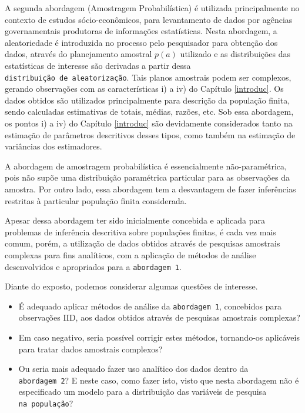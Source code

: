 \documentclass[]{book}
\numberwithin{example}{chapter}
\numberwithin{remark}{chapter}
\numberwithin{definition}{chapter}
\begin{document}
A segunda abordagem (Amostragem Probabilística) é utilizada
principalmente no contexto de estudos sócio-econômicos, para
levantamento de dados por agências governamentais produtoras de
informações estatísticas. Nesta abordagem, a aleatoriedade é introduzida
no processo pelo pesquisador para obtenção dos dados, através do
planejamento amostral \(p(a)\) utilizado \citep{Neyman} e as
distribuições das estatísticas de interesse são derivadas a partir dessa
\texttt{distribuição\ de\ aleatorização}. Tais planos amostrais podem
ser complexos, gerando observações com as características i) a iv) do
Capítulo \ref{introduc}. Os dados obtidos são utilizados principalmente
para descrição da população finita, sendo calculadas estimativas de
totais, médias, razões, etc. Sob essa abordagem, os pontos i) a iv) do
Capítulo \ref{introduc} são devidamente considerados tanto na estimação
de parâmetros descritivos desses tipos, como também na estimação de
variâncias dos estimadores.

A abordagem de amostragem probabilística é essencialmente
não-paramétrica, pois não supõe uma distribuição paramétrica particular
para as observações da amostra. Por outro lado, essa abordagem tem a
desvantagem de fazer inferências restritas à particular população finita
considerada.

Apesar dessa abordagem ter sido inicialmente concebida e aplicada para
problemas de inferência descritiva sobre populações finitas, é cada vez
mais comum, porém, a utilização de dados obtidos através de pesquisas
amostrais complexas para fins analíticos, com a aplicação de métodos de
análise desenvolvidos e apropriados para a \texttt{abordagem\ 1}.

Diante do exposto, podemos considerar algumas questões de interesse.

\begin{itemize}
\item
  É adequado aplicar métodos de análise da \texttt{abordagem\ 1},
  concebidos para observações IID, aos dados obtidos através de
  pesquisas amostrais complexas?
\item
  Em caso negativo, seria possível corrigir estes métodos, tornando-os
  aplicáveis para tratar dados amostrais complexos?
\item
  Ou seria mais adequado fazer uso analítico dos dados dentro da
  \texttt{abordagem\ 2}? E neste caso, como fazer isto, visto que nesta
  abordagem não é especificado um modelo para a distribuição das
  variáveis de pesquisa \texttt{na\ população}?
\end{itemize}
\end{document}
